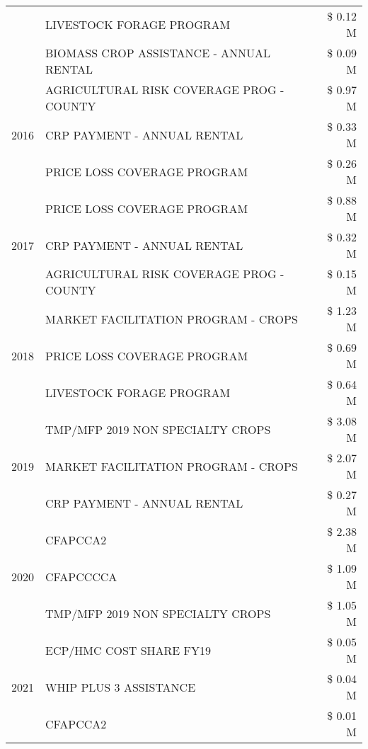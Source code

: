 \begin{tabular}{llr}
 & LIVESTOCK FORAGE PROGRAM & \$ 0.12 M \\
 & BIOMASS CROP ASSISTANCE - ANNUAL RENTAL & \$ 0.09 M \\
\cline{1-3}
\multirow[t]{3}{*}{2016} & AGRICULTURAL RISK COVERAGE PROG - COUNTY & \$ 0.97 M \\
 & CRP PAYMENT - ANNUAL RENTAL & \$ 0.33 M \\
 & PRICE LOSS COVERAGE PROGRAM & \$ 0.26 M \\
\cline{1-3}
\multirow[t]{3}{*}{2017} & PRICE LOSS COVERAGE PROGRAM & \$ 0.88 M \\
 & CRP PAYMENT - ANNUAL RENTAL & \$ 0.32 M \\
 & AGRICULTURAL RISK COVERAGE PROG - COUNTY & \$ 0.15 M \\
\cline{1-3}
\multirow[t]{3}{*}{2018} & MARKET FACILITATION PROGRAM - CROPS & \$ 1.23 M \\
 & PRICE LOSS COVERAGE PROGRAM & \$ 0.69 M \\
 & LIVESTOCK FORAGE PROGRAM & \$ 0.64 M \\
\cline{1-3}
\multirow[t]{3}{*}{2019} & TMP/MFP 2019 NON SPECIALTY CROPS & \$ 3.08 M \\
 & MARKET FACILITATION PROGRAM - CROPS & \$ 2.07 M \\
 & CRP PAYMENT - ANNUAL RENTAL & \$ 0.27 M \\
\cline{1-3}
\multirow[t]{3}{*}{2020} & CFAPCCA2 & \$ 2.38 M \\
 & CFAPCCCCA & \$ 1.09 M \\
 & TMP/MFP 2019 NON SPECIALTY CROPS & \$ 1.05 M \\
\cline{1-3}
\multirow[t]{3}{*}{2021} & ECP/HMC COST SHARE FY19 & \$ 0.05 M \\
 & WHIP PLUS 3 ASSISTANCE & \$ 0.04 M \\
 & CFAPCCA2 & \$ 0.01 M \\
\cline{1-3}
\bottomrule
\end{tabular}
